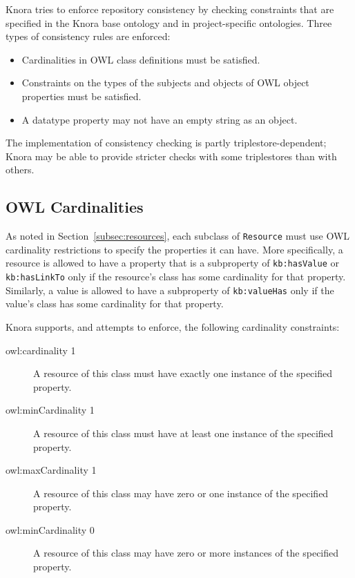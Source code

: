 \documentclass[12pt, a4paper]{article}
\begin{document}
Knora tries to enforce repository consistency by checking constraints that are specified in the Knora base ontology and in project-specific ontologies. Three types of consistency rules are enforced:

\begin{itemize}
	\item Cardinalities in OWL class definitions must be satisfied.
	\item Constraints on the types of the subjects and objects of OWL object properties must be satisfied.
	\item A datatype property may not have an empty string as an object.
\end{itemize}

The implementation of consistency checking is partly triplestore-dependent; Knora may be able to provide stricter checks with some triplestores than with others.

\subsection{OWL Cardinalities}

\label{subsec:cardinalities}

As noted in Section~\ref{subsec:resources}, each subclass of \texttt{Resource} must use OWL cardinality restrictions to specify the properties it can have. More specifically, a resource is allowed to have a property that is a subproperty of \texttt{kb:hasValue} or \texttt{kb:hasLinkTo} only if the resource's class has some cardinality for that property. Similarly, a value is allowed to have a subproperty of \texttt{kb:valueHas} only if the value's class has some cardinality for that property.

Knora supports, and attempts to enforce, the following cardinality constraints:
 
\begin{description}
	\item[owl:cardinality 1] A resource of this class must have exactly one instance of the specified property.
	\item[owl:minCardinality 1] A resource of this class must have at least one instance of the specified property.
	\item[owl:maxCardinality 1] A resource of this class may have zero or one instance of the specified property.
	\item[owl:minCardinality 0] A resource of this class may have zero or more instances of the specified property.
\end{description}
\end{document}
